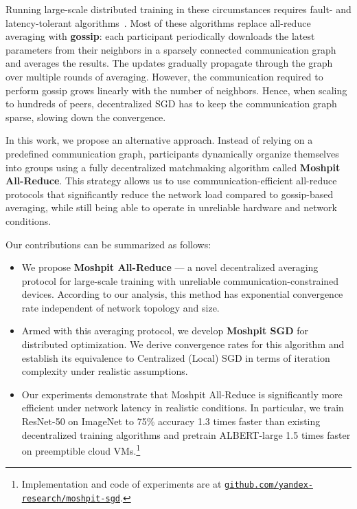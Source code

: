 Running large-scale distributed training in these circumstances requires fault- and latency-tolerant algorithms~\cite{lian2017can,sgpush}. Most of these algorithms replace all-reduce averaging with \textbf{gossip}: each participant periodically downloads the latest parameters from their neighbors in a sparsely connected communication graph and averages the results. The updates gradually propagate through the graph over multiple rounds of averaging.
However, the communication required to perform gossip grows linearly with the number of neighbors. Hence, when scaling to hundreds of peers, decentralized SGD has to keep the communication graph sparse, slowing down the convergence.

In this work, we propose an alternative approach. Instead of relying on a predefined communication graph, participants dynamically organize themselves into groups using a fully decentralized matchmaking algorithm called \textbf{Moshpit All-Reduce}. This strategy allows us to use communication-efficient all-reduce protocols that significantly reduce the network load compared to gossip-based averaging, while still being able to operate in unreliable hardware and network conditions.

Our contributions can be summarized as follows:
\begin{itemize}
    \item We propose {\bf Moshpit All-Reduce} --- a novel decentralized averaging protocol for large-scale training with unreliable communication-constrained devices. According to our analysis, this method has exponential convergence rate independent of network topology and size.
    \item Armed with this averaging protocol, we develop {\bf Moshpit SGD} for distributed optimization. We derive convergence rates for this algorithm and establish its equivalence to Centralized (Local) SGD in terms of iteration complexity under realistic assumptions.
    \item Our experiments demonstrate that Moshpit All-Reduce is significantly more efficient under network latency in realistic conditions. In particular, we train ResNet-50 on ImageNet to 75\% accuracy 1.3 times faster than existing decentralized training algorithms and pretrain ALBERT-large 1.5 times faster on preemptible cloud VMs.\footnote{Implementation and code of experiments are at \href{https://github.com/yandex-research/moshpit-sgd}{\texttt{github.com/yandex-research/moshpit-sgd}}.}
\end{itemize}
